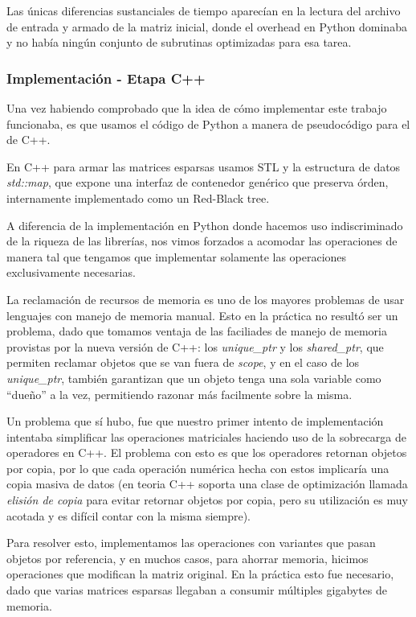 Las únicas diferencias sustanciales de tiempo aparecían en la lectura del archivo de entrada
y armado de la matriz inicial, donde el overhead en Python dominaba y no había
ningún conjunto de subrutinas optimizadas para esa tarea.

\subsubsection{Implementación - Etapa C++} %
\label{ssub:implementaci_n_etapa_c_}

Una vez habiendo comprobado que la idea de cómo implementar este trabajo
funcionaba, es que usamos el código de Python a manera de pseudocódigo para el de C++.

En C++ para armar las matrices esparsas usamos STL y la estructura de datos
\textit{std::map}, que expone una interfaz de contenedor genérico que preserva órden, internamente
implementado como un Red-Black tree.

A diferencia de la implementación en Python donde hacemos uso indiscriminado
de la riqueza de las librerías, nos vimos forzados a acomodar las operaciones
de manera tal que tengamos que implementar solamente las operaciones exclusivamente necesarias.

La reclamación de recursos de memoria es uno de los mayores problemas de usar
lenguajes con manejo de memoria manual. Esto en la práctica no resultó ser un problema,
dado que tomamos ventaja de las faciliades de manejo de memoria provistas por la nueva versión
de C++: los \textit{unique\_ptr} y los \textit{shared\_ptr}, que permiten reclamar objetos que se van fuera de
\textit{scope}, y en el caso de los \textit{unique\_ptr}, también garantizan que un objeto tenga
una sola variable como ``dueño'' a la vez, permitiendo razonar más facilmente sobre la misma.

Un problema que sí hubo, fue que nuestro primer intento de implementación intentaba simplificar
las operaciones matriciales haciendo uso de la sobrecarga de operadores en C++. El problema
con esto es que los operadores retornan objetos por copia, por lo que cada operación numérica
hecha con estos implicaría una copia masiva de datos (en teoria C++ soporta una clase de optimización
llamada \textit{elisión de copia} para evitar retornar objetos por copia, pero su utilización es muy acotada y
es difícil contar con la misma siempre).

Para resolver esto, implementamos las operaciones con variantes que pasan objetos por referencia, y
en muchos casos, para ahorrar memoria, hicimos operaciones que modifican la matriz original. En la práctica
esto fue necesario, dado que varias matrices esparsas llegaban a consumir múltiples gigabytes de memoria.



